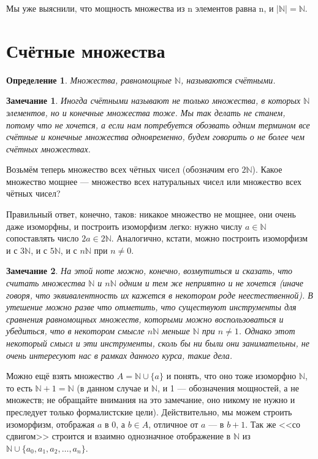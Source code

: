 \documentclass[12pt, onecolumn]{report}
\newtheorem{definition}{Определение}
\newtheorem*{remark}{Замечание}
\begin{document}
Мы уже выяснили, что мощность множества из n элементов равна n, и $|\mathbb N| = \mathbb N$.

\section{Счётные множества}
\begin{definition}
Множества, равномощные $\mathbb N$, называются счётными.
\end{definition}
\begin{remark}
Иногда счётными называют не только множества, в которых $\mathbb N$ элементов, но и конечные множества тоже. Мы так делать не станем, потому что не хочется, а если нам потребуется обозвать одним термином все счётные и конечные множества одновременно, будем говорить о не более чем счётных множествах.
\end{remark}
Возьмём теперь множество всех чётных чисел (обозначим его $2\mathbb N$). Какое множество мощнее --- множество всех натуральных чисел или множество всех чётных чисел?

Правильный ответ, конечно, таков: никакое множество не мощнее, они очень даже изоморфны, и построить изоморфизм легко: нужно числу $a \in \mathbb N$ сопоставлять число $2a \in 2\mathbb N$. Аналогично, кстати, можно построить изоморфизм и с $3 \mathbb N$, и с $5\mathbb N$, и с $n\mathbb N$ при $n \neq 0$.

\begin{remark}
На этой ноте можно, конечно, возмутиться и сказать, что считать множества $\mathbb N$ и $n\mathbb N$ одним и тем же неприятно и не хочется (иначе говоря, что эквивалентность их кажется в некотором роде неестественной). В утешение можно разве что отметить, что существуют инструменты для сравнения равномощных множеств, которыми можно воспользоваться и убедиться, что в некотором смысле $n\mathbb N$ меньше $\mathbb N$ при $n \neq 1$. Однако этот некоторый смысл и эти инструменты, сколь бы ни были они занимательны, не очень интересуют нас в рамках данного курса, такие дела.
\end{remark}

Можно ещё взять множество $A =\mathbb N \cup \{a\}$ и понять, что оно тоже изоморфно $\mathbb N$, то есть $\mathbb N + 1 = \mathbb N$ (в данном случае и $\mathbb N$, и 1 --- обозначения мощностей, а не множеств; не обращайте внимания на это замечание, оно никому не нужно и преследует только формалистские цели). Действительно, мы можем строить изоморфизм, отображая $a$ в 0, а $b \in A$, отличное от $a$ --- в $b + 1$. Так же <<со сдвигом>> строится и взаимно однозначное отображение в $\mathbb N$ из $\mathbb N \cup \{a_0, a_1, a_2, \ldots , a_n\}$.
\end{document}
